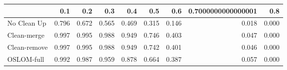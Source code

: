 \begin{tabular}{lrrrrrrrr}
\toprule
{} &   0.1 &   0.2 &   0.3 &   0.4 &   0.5 &   0.6 & 0.7000000000000001 &   0.8 \\
\midrule
No Clean Up  & 0.796 & 0.672 & 0.565 & 0.469 & 0.315 & 0.146 &              0.018 & 0.000 \\
Clean-merge  & 0.997 & 0.995 & 0.988 & 0.949 & 0.746 & 0.403 &              0.047 & 0.000 \\
Clean-remove & 0.997 & 0.995 & 0.988 & 0.949 & 0.742 & 0.401 &              0.046 & 0.000 \\
OSLOM-full   & 0.992 & 0.987 & 0.959 & 0.878 & 0.664 & 0.387 &              0.057 & 0.000 \\
\bottomrule
\end{tabular}
